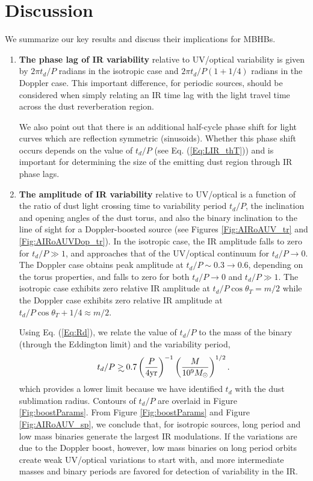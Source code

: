 \section{Discussion}
\label{S:Discussion}
We summarize our key results and discuss their implications for MBHBs.

\begin{enumerate}
%
\item{ 

\textbf{The phase lag of IR variability} relative to UV/optical variability is
given by $2 \pi t_d/P$ radians in the isotropic case and $2 \pi t_d/P(1 +
1/4)$ radians in the Doppler case. This important difference, for periodic
sources, should be considered when simply relating an IR time lag with the
light travel time across the dust reverberation region.

We also point out that there is an additional half-cycle phase shift for light
curves which are reflection symmetric (sinusoids). Whether this phase
shift occurs depends on the value of $t_d/P$ (see Eq. (\ref{Eq:LIR_thT})) and is
important for determining the size of the emitting dust region through IR
phase lags. 

}

\item{   

\textbf{The amplitude of IR variability} relative to UV/optical  is a function
of the ratio of dust light crossing time to variability period $t_d/P$, the
inclination and opening angles of the dust torus, and also the binary
inclination to the line of sight for a Doppler-boosted source (see Figures
\ref{Fig:AIRoAUV_tr} and \ref{Fig:AIRoAUVDop_tr}). In the isotropic case, the IR amplitude falls to zero for
$t_d/P \gg 1$, and approaches that of the UV/optical continuum for $t_d/P
\rightarrow 0$.  The Doppler case obtains peak amplitude at $t_d/P \sim 0.3
\rightarrow 0.6$, depending on the torus properties, and falls to zero for
both $t_d/P \rightarrow 0$ and $t_d/P \gg 1$. The isotropic case exhibits zero
relative IR amplitude at $t_d/P \cos{\theta_T} = m/2$ while the Doppler case
exhibits zero relative IR amplitude at $t_d/P \cos{\theta_T} + 1/4 \approx
m/2$.


Using Eq. (\ref{Eq:Rd}), we relate the value of $t_d/P$ to the mass of the
binary (through the Eddington limit) and the variability period,
\begin{equation}
t_d/P \gsim 0.7 \left(\frac{P}{4 \rm{yr} } \right)^{-1} \left(\frac{M}{10^9 \Msun } \right)^{1/2}.
\end{equation}
which provides a lower limit because we have identified $t_d$ with the dust sublimation radius.
Contours of $t_d/P$ are overlaid in Figure \ref{Fig:boostParams}. From Figure
\ref{Fig:boostParams} and Figure \ref{Fig:AIRoAUV_sp}, we conclude that, for
isotropic sources, long period and low mass binaries generate the largest
IR modulations. If the variations are due to the Doppler boost, however, low
mass binaries on long period orbits create weak UV/optical variations to start
with, and more intermediate masses and binary periods are favored for
detection of variability in the IR. 

}
\end{enumerate}
